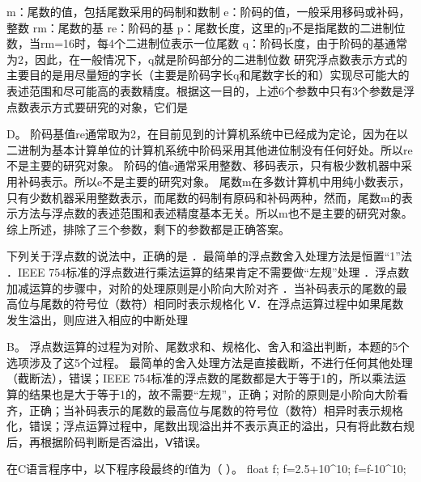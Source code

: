 m：尾数的值，包括尾数采用的码制和数制
e：阶码的值，一般采用移码或补码，整数 rm：尾数的基 re：阶码的基
p：尾数长度，这里的p不是指尾数的二进制位数，当rm=16时，每4个二进制位表示一位尾数
q：阶码长度，由于阶码的基通常为2，因此，在一般情况下，q就是阶码部分的二进制位数
研究浮点数表示方式的主要目的是用尽量短的字长（主要是阶码字长q和尾数字长的和）实现尽可能大的表述范围和尽可能高的表数精度。根据这一目的，上述6个参数中只有3个参数是浮点数表示方式要研究的对象，它们是
\par{}
\begin{solution}D。
阶码基值re通常取为2，在目前见到的计算机系统中已经成为定论，因为在以二进制为基本计算单位的计算机系统中阶码采用其他进位制没有任何好处。所以re不是主要的研究对象。
阶码的值e通常采用整数、移码表示，只有极少数机器中采用补码表示。所以e不是主要的研究对象。
尾数m在多数计算机中用纯小数表示，只有少数机器采用整数表示，而尾数的码制有原码和补码两种，然而，尾数m的表示方法与浮点数的表述范围和表述精度基本无关。所以m也不是主要的研究对象。
综上所述，排除了三个参数，剩下的参数都是正确答案。
\end{solution}
\question 下列关于浮点数的说法中，正确的是
．最简单的浮点数舍入处理方法是恒置``1''法 ．IEEE
754标准的浮点数进行乘法运算的结果肯定不需要做``左规''处理
．浮点数加减运算的步骤中，对阶的处理原则是小阶向大阶对齐
．当补码表示的尾数的最高位与尾数的符号位（数符）相同时表示规格化
Ⅴ．在浮点运算过程中如果尾数发生溢出，则应进入相应的中断处理
\par{}
\begin{solution}B。
浮点数运算的过程为对阶、尾数求和、规格化、舍入和溢出判断，本题的5个选项涉及了这5个过程。
最简单的舍入处理方法是直接截断，不进行任何其他处理（截断法），错误；IEEE
754标准的浮点数的尾数都是大于等于1的，所以乘法运算的结果也是大于等于1的，故不需要``左规''，正确；对阶的原则是小阶向大阶看齐，正确；当补码表示的尾数的最高位与尾数的符号位（数符）相异时表示规格化，错误；浮点运算过程中，尾数出现溢出并不表示真正的溢出，只有将此数右规后，再根据阶码判断是否溢出，Ⅴ错误。
\end{solution}
\question 在C语言程序中，以下程序段最终的f值为（ ）。 float f; f=2.5+10\^{}10;
f=f-10\^{}10;
\par{}
